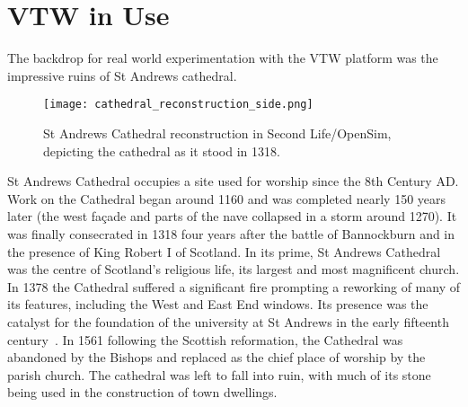 \section{VTW in Use}

\newcommand{\thinkpadFootnote}{\footnote{\url{http://support.lenovo.com/us/en/documents/pd012148}}}

\newcommand{\wrtFootnote}{\footnote{\url{http://support.linksys.com/en-eu/support/routers/WRT54G}}}


The backdrop for real world experimentation with the VTW platform was the impressive ruins of St Andrews cathedral.

\begin{figure}[h]
\centering
  \texttt{[image: cathedral\_reconstruction\_side.png]}
  \caption{St Andrews Cathedral reconstruction in Second Life/OpenSim, depicting the cathedral as it stood in 1318.}
  \label{cathedral_reconstruction_side.png}
\end{figure}



St Andrews Cathedral occupies a site used for worship since the 8th Century AD. Work on the Cathedral began around 1160 and was completed nearly 150 years later (the west fa\c{c}ade and parts of the nave collapsed in a storm around 1270). It was finally consecrated in 1318 four years after the battle of Bannockburn and in the presence of King Robert I of Scotland. In its prime, St Andrews Cathedral was the centre of Scotland's religious life, its largest and most magnificent church. In 1378 the Cathedral suffered a significant fire prompting
a reworking of many of its features, including the West and East End windows. Its presence was the catalyst for the foundation of the university at St Andrews in the early fifteenth century~\cite{Fawcett2011}. In 1561 following the Scottish reformation, the Cathedral was abandoned by the Bishops and replaced as the chief place of worship by the parish church. The cathedral was left to fall into ruin, with much of its stone being used in the construction of town dwellings.


